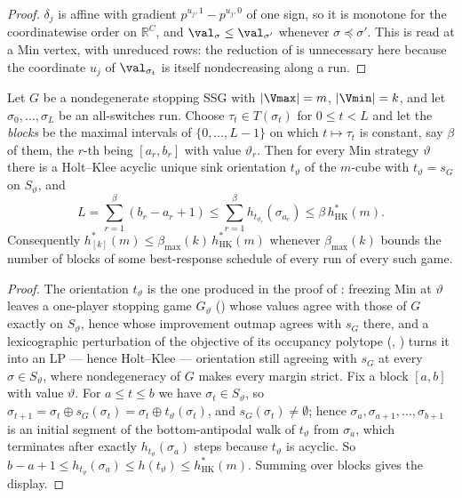 \begin{proof}
$\delta_j$ is affine with gradient $p^{u_j,1}-p^{u_j,0}$ of one sign, so
it is monotone for the coordinatewise order on $\mathbb R^{C}$, and
$\val_\sigma\le\val_{\sigma'}$ whenever $\sigma\preceq\sigma'$. This is
 read at a Min vertex, with unreduced rows: the
reduction of  is unnecessary here because the
coordinate $u_j$ of $\val_{\sigma_t}$ is itself nondecreasing along a run.
\end{proof}

\begin{theorem}\label{mb:blocks}
Let $G$ be a nondegenerate stopping SSG with $|\Vmax|=m$, $|\Vmin|=k$, and
let $\sigma_0,\dots,\sigma_L$ be an all-switches run. Choose
$\tau_t\in T(\sigma_t)$ for $0\le t<L$ and let the \emph{blocks} be the
maximal intervals of $\{0,\dots,L-1\}$ on which $t\mapsto\tau_t$ is
constant, say $\beta$ of them, the $r$-th being $[a_r,b_r]$ with value
$\vartheta_r$. Then for every Min strategy $\vartheta$ there is a
Holt--Klee acyclic unique sink orientation $t_\vartheta$ of the $m$-cube
with $t_\vartheta=s_G$ on $S_\vartheta$, and
\[
  L=\sum_{r=1}^{\beta}(b_r-a_r+1)
   \le\sum_{r=1}^{\beta}h_{t_{\vartheta_r}}(\sigma_{a_r})
   \le\beta\,h^{\ast}_{\mathrm{HK}}(m).
\]
Consequently $h^{\ast}_{[k]}(m)\le\beta_{\max}(k)\,h^{\ast}_{\mathrm{HK}}(m)$
whenever $\beta_{\max}(k)$ bounds the number of blocks of some
best-response schedule of every run of every such game.
\end{theorem}

\begin{proof}
The orientation $t_\vartheta$ is the one produced in the proof of
: freezing Min at $\vartheta$ leaves a one-player
stopping game $G_\vartheta$ () whose values agree with
those of $G$ exactly on $S_\vartheta$, hence whose improvement outmap
agrees with $s_G$ there, and a lexicographic perturbation of the objective
of its occupancy polytope (, )
turns it into an LP --- hence Holt--Klee --- orientation still agreeing
with $s_G$ at every $\sigma\in S_\vartheta$, where nondegeneracy of $G$
makes every margin strict.
Fix a block $[a,b]$ with value $\vartheta$. For $a\le t\le b$ we have
$\sigma_t\in S_\vartheta$, so
$\sigma_{t+1}=\sigma_t\oplus s_G(\sigma_t)=\sigma_t\oplus t_\vartheta(\sigma_t)$,
and $s_G(\sigma_t)\ne\emptyset$; hence
$\sigma_a,\sigma_{a+1},\dots,\sigma_{b+1}$ is an initial segment of the
bottom-antipodal walk of $t_\vartheta$ from $\sigma_a$, which terminates
after exactly $h_{t_\vartheta}(\sigma_a)$ steps because $t_\vartheta$ is
acyclic. So $b-a+1\le h_{t_\vartheta}(\sigma_a)\le h(t_\vartheta)\le
h^{\ast}_{\mathrm{HK}}(m)$. Summing over blocks gives the display.
\end{proof}

